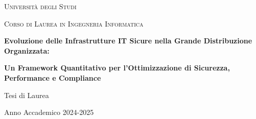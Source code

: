 \documentclass[12pt,a4paper,twoside]{book}
\begin{document}
\begin{titlepage}
    \centering
    \vspace*{2cm}
    {\scshape\LARGE Università degli Studi\par}
    \vspace{1cm}
    {\scshape\Large Corso di Laurea in Ingegneria Informatica\par}
    \vspace{1.5cm}
    {\huge\bfseries Evoluzione delle Infrastrutture IT Sicure nella Grande Distribuzione Organizzata:\par}
    \vspace{0.5cm}
    {\Large\bfseries Un Framework Quantitativo per l'Ottimizzazione di Sicurezza, Performance e Compliance\par}
    \vfill
    {\Large Tesi di Laurea\par}
    \vfill
    {\large Anno Accademico 2024-2025\par}
\end{titlepage}

\tableofcontents



%


%
%
%
%
%
%
%
%
%
%
%
\printbibliography[heading=bibintoc,title={Bibliografia}]
\printbibliography[
  heading=subbibliography,
  title={Bibliografia del Capitolo},
  segment=\therefsegment,
  nottype=online  %
]

\printbibliography[
  heading=subbibliography,
  title={Sitografia del Capitolo},
  segment=\therefsegment,
  type=online
]
\end{document}
